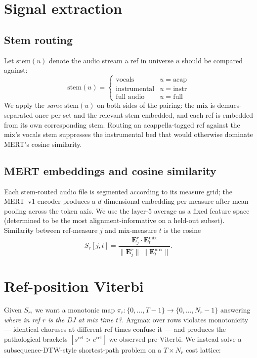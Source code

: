 \documentclass[11pt,a4paper]{article}
\begin{document}
\section{Signal extraction}
\label{sec:mert}

\subsection{Stem routing}

Let $\text{stem}(u)$ denote the audio stream a ref in universe $u$ should be compared against:
\[
\text{stem}(u) = \begin{cases}
\text{vocals} & u = \text{acap} \\
\text{instrumental} & u = \text{instr} \\
\text{full audio} & u = \text{full}
\end{cases}
\]
We apply the \emph{same} $\text{stem}(u)$ on both sides of the pairing: the mix is demucs-separated once per set and the relevant stem embedded, and each ref is embedded from its own corresponding stem. Routing an acappella-tagged ref against the mix's vocals stem suppresses the instrumental bed that would otherwise dominate MERT's cosine similarity.

\subsection{MERT embeddings and cosine similarity}

Each stem-routed audio file is segmented according to its measure grid; the MERT~v1 encoder produces a $d$-dimensional embedding per measure after mean-pooling across the token axis. We use the layer-5 average as a fixed feature space (determined to be the most alignment-informative on a held-out subset). Similarity between ref-measure $j$ and mix-measure $t$ is the cosine
\[
S_r[j, t] = \frac{\mathbf{E}^r_j \cdot \mathbf{E}^{\text{mix}}_t}{\|\mathbf{E}^r_j\| \, \|\mathbf{E}^{\text{mix}}_t\|}.
\]

\section{Ref-position Viterbi}
\label{sec:refvit}

Given $S_r$, we want a monotonic map $\pi_r : \{0, \dots, T{-}1\} \to \{0, \dots, N_r{-}1\}$ answering \emph{where in ref $r$ is the DJ at mix time $t$?}. Argmax over rows violates monotonicity --- identical choruses at different ref times confuse it --- and produces the pathological brackets $[s^{\text{ref}} > e^{\text{ref}}]$ we observed pre-Viterbi. We instead solve a subsequence-DTW-style shortest-path problem on a $T \times N_r$ cost lattice:
\end{document}
